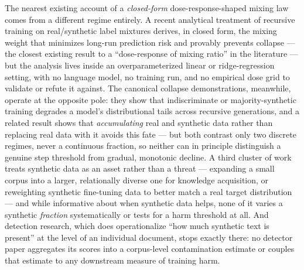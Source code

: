 \documentclass[11pt]{article}
\begin{document}
The nearest existing account of a \emph{closed-form} dose-response-shaped mixing law comes from a different regime entirely. A recent analytical treatment of recursive training on real/synthetic label mixtures derives, in closed form, the mixing weight that minimizes long-run prediction risk and provably prevents collapse --- the closest existing result to a ``dose-response of mixing ratio'' in the literature --- but the analysis lives inside an overparameterized linear or ridge-regression setting, with no language model, no training run, and no empirical dose grid to validate or refute it against. The canonical collapse demonstrations, meanwhile, operate at the opposite pole: they show that indiscriminate or majority-synthetic training degrades a model's distributional tails across recursive generations, and a related result shows that \emph{accumulating} real and synthetic data rather than replacing real data with it avoids this fate --- but both contrast only two discrete regimes, never a continuous fraction, so neither can in principle distinguish a genuine step threshold from gradual, monotonic decline. A third cluster of work treats synthetic data as an asset rather than a threat --- expanding a small corpus into a larger, relationally diverse one for knowledge acquisition, or reweighting synthetic fine-tuning data to better match a real target distribution --- and while informative about when synthetic data helps, none of it varies a synthetic \emph{fraction} systematically or tests for a harm threshold at all. And detection research, which does operationalize ``how much synthetic text is present'' at the level of an individual document, stops exactly there: no detector paper aggregates its scores into a corpus-level contamination estimate or couples that estimate to any downstream measure of training harm.
\end{document}
